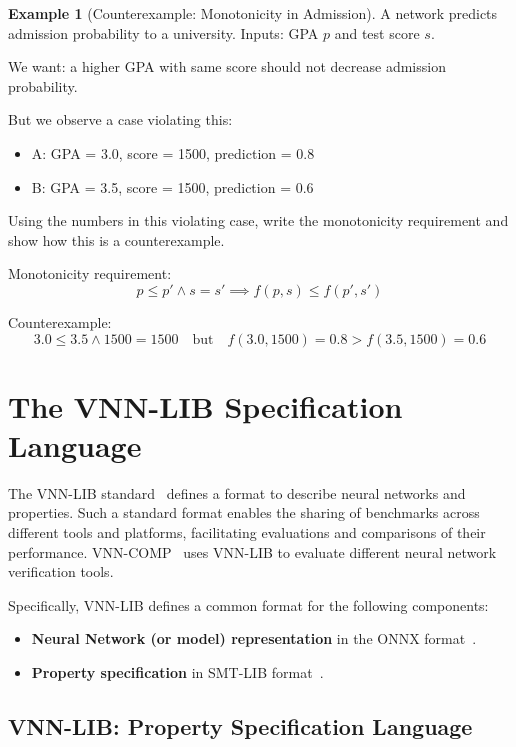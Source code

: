 \documentclass[oneside,11pt,dvipsnames]{book}
\numberwithin{equation}{section}
\theoremstyle{definition}
\newtheorem{example}{Example}[section]
\theoremstyle{remark}
\begin{document}
\begin{example}[Counterexample: Monotonicity in Admission]
A network predicts admission probability to a university. Inputs: GPA $p$ and test score $s$.  

We want: a higher GPA with same score should not decrease admission probability.  

But we observe a case violating this:
\begin{itemize}
 \item A: GPA = 3.0, score = 1500, prediction = 0.8  
 \item B: GPA = 3.5, score = 1500, prediction = 0.6  
\end{itemize}

Using the numbers in this violating case, write the monotonicity requirement and show how this is a counterexample.


Monotonicity requirement:
\[
p \leq p' \land s = s' \implies f(p,s) \leq f(p',s')
\]

Counterexample:
\[
3.0 \leq 3.5 \land 1500 = 1500 \quad \text{but} \quad f(3.0,1500)=0.8 > f(3.5,1500)=0.6
\]

\end{example}


\section{The VNN-LIB  Specification Language}


The VNN-LIB standard~\cite{demarchi2023supporting,vnnlib} defines a format to describe neural networks and properties. Such a standard format enables the sharing of benchmarks across different tools and platforms, facilitating evaluations and comparisons of their performance. VNN-COMP~\cite{brix2024fifth} uses VNN-LIB to evaluate different neural network verification tools.


Specifically, VNN-LIB defines a common format for the following components:
\begin{itemize}
    \item \textbf{Neural Network (or model) representation} in the ONNX format~\cite{onnx}.
    \item \textbf{Property specification} in SMT-LIB format~\cite{barrett2010smt}.
\end{itemize}



\subsection{VNN-LIB: Property Specification Language}
\end{document}
